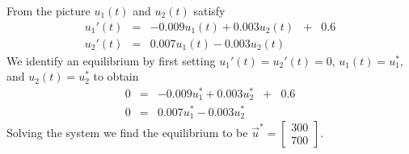 \documentclass[../book.tex]{subfiles}
\begin{document}
\begin{solution}
From the picture \(u_1(t)\) and \(u_2(t)\) satisfy
\begin{equation}\label{eq:sys-45}
\begin{array}{lcrcc}
  u_1'(t) &=& - 0.009  u_1(t) + 0.003 u_2(t) &+& 0.6\\
  u_2'(t) &=& 0.007  u_1(t) - 0.003 u_2(t) 
\end{array}
\end{equation}
We identify an equilibrium by first setting \(u_1'(t) = u_2'(t) = 0\), \(u_1(t) = u_1^*\), and \(u_2(t) =u_2^*\) to obtain
\begin{equation}\label{eq:sys-46}
\begin{array}{lcrcc}
  0 &=& - 0.009  u_1^* + 0.003 u_2^* &+& 0.6\\
  0 &=& 0.007  u_1^* - 0.003 u_2^* 
\end{array}
\end{equation}
Solving the system we find the equilibrium to be \(\vec{u}^{ *} = \begin{bmatrix} 300 \\ 700 \end{bmatrix}\).


\end{solution}
\end{document}
